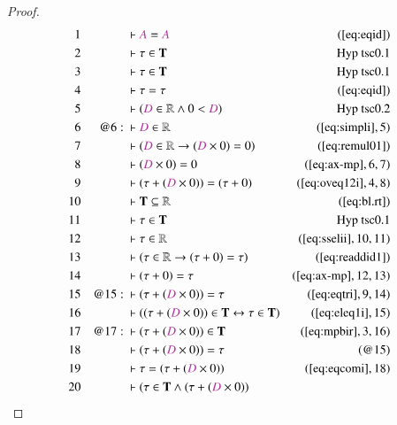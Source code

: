 \begin{proof}
\begin{align}
  1 &&  & \vdash \mc{A} = \mc{A}&(\mbox{\ref{eq:eqid}})\notag
  \\ 2 &&  & \vdash \tau \in \mathbf{T}&\text{Hyp~tsc0.1}\notag%
  \\ 3 &&  & \vdash \tau \in \mathbf{T}&\text{Hyp~tsc0.1}\notag%
  \\ 4 &&  & \vdash \tau = \tau&(\mbox{\ref{eq:eqid}})\notag
  \\ 5 &&  & \vdash ( \mc{D} \in \mathbb{R} \wedge 0 < \mc{D}
      )&\text{Hyp~tsc0.2}\notag%
  \\ 6 && @6:\  & \vdash \mc{D} \in \mathbb{R}&(\mbox{\ref{eq:simpli}},5)\notag
  \\ 7 &&  & \vdash ( \mc{D} \in \mathbb{R} \rightarrow ( \mc{D} \times 0 ) = 0
      )&(\mbox{\ref{eq:remul01}})\notag
  \\ 8 &&  & \vdash ( \mc{D} \times 0 ) = 0&(\mbox{\ref{eq:ax-mp}},6,7)\notag
  \\ 9 &&  & \vdash ( \tau + ( \mc{D} \times 0 ) ) = ( \tau + 0
      )&(\mbox{\ref{eq:oveq12i}},4,8)\notag
  \\ 10 &&  & \vdash \mathbf{T} \subseteq
      \mathbb{R}&(\mbox{\ref{eq:bl.rt}})\notag
  \\ 11 &&  & \vdash \tau \in \mathbf{T}&\text{Hyp~tsc0.1}\notag%
  \\ 12 &&  & \vdash \tau \in \mathbb{R}&(\mbox{\ref{eq:sselii}},10,11)\notag
  \\ 13 &&  & \vdash ( \tau \in \mathbb{R} \rightarrow ( \tau + 0 ) = \tau
      )&(\mbox{\ref{eq:readdid1}})\notag
  \\ 14 &&  & \vdash ( \tau + 0 ) = \tau&(\mbox{\ref{eq:ax-mp}},12,13)\notag
  \\ 15 && @15:\  & \vdash ( \tau + ( \mc{D} \times 0 ) ) =
      \tau&(\mbox{\ref{eq:eqtri}},9,14)\notag
  \\ 16 &&  & \vdash ( ( \tau + ( \mc{D} \times 0 ) ) \in \mathbf{T}
      \leftrightarrow \tau \in \mathbf{T}
      )&(\mbox{\ref{eq:eleq1i}},15)\notag
  \\ 17 && @17:\  & \vdash ( \tau + ( \mc{D} \times 0 ) ) \in
      \mathbf{T}&(\mbox{\ref{eq:mpbir}},3,16)\notag
  \\ 18 &&  & \vdash ( \tau + ( \mc{D} \times 0 ) ) = \tau&(@15)\notag
  \\ 19 &&  & \vdash \tau = ( \tau + ( \mc{D} \times 0 )
      )&(\mbox{\ref{eq:eqcomi}},18)\notag
  \\ 20 &&  & \vdash ( \tau \in \mathbf{T} \wedge ( \tau + ( \mc{D} \times 0 ) )

\end{align}
\end{proof}
